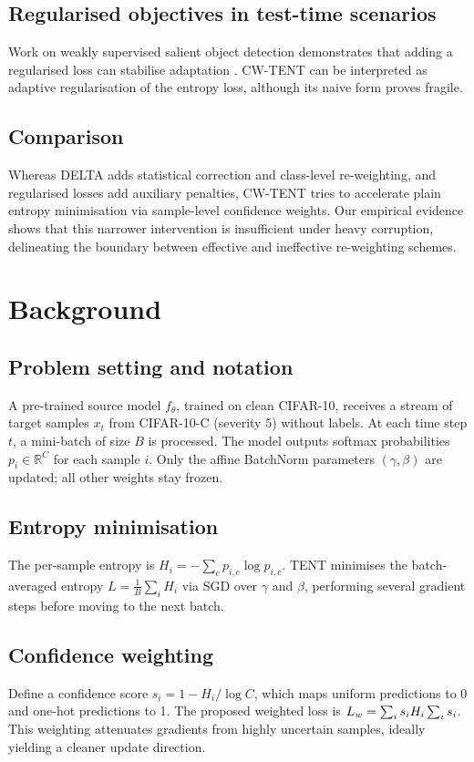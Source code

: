 \documentclass{article} %
\begin{document}
\subsection{Regularised objectives in test-time scenarios}
Work on weakly supervised salient object detection demonstrates that adding a regularised loss can stabilise adaptation \cite{author-year-test}. CW-TENT can be interpreted as adaptive regularisation of the entropy loss, although its naive form proves fragile.

\subsection{Comparison}
Whereas DELTA adds statistical correction and class-level re-weighting, and regularised losses add auxiliary penalties, CW-TENT tries to accelerate plain entropy minimisation via sample-level confidence weights. Our empirical evidence shows that this narrower intervention is insufficient under heavy corruption, delineating the boundary between effective and ineffective re-weighting schemes.

\section{Background}
\label{sec:background}
\subsection{Problem setting and notation}
A pre-trained source model \(f_{\theta}\), trained on clean CIFAR-10, receives a stream of target samples \(x_t\) from CIFAR-10-C (severity 5) without labels. At each time step \(t\), a mini-batch of size \(B\) is processed. The model outputs softmax probabilities \(p_i \in \mathbb{R}^C\) for each sample \(i\). Only the affine BatchNorm parameters \((\gamma, \beta)\) are updated; all other weights stay frozen.

\subsection{Entropy minimisation}
The per-sample entropy is \(H_i = -\sum_{c} p_{i,c} \log p_{i,c}\). TENT minimises the batch-averaged entropy \(L = \tfrac{1}{B} \sum_i H_i\) via SGD over \(\gamma\) and \(\beta\), performing several gradient steps before moving to the next batch.

\subsection{Confidence weighting}
Define a confidence score \(s_i = 1 - H_i/\log C\), which maps uniform predictions to 0 and one-hot predictions to 1. The proposed weighted loss is \(L_w = \sum_i s_i H_i \/ \sum_i s_i\). This weighting attenuates gradients from highly uncertain samples, ideally yielding a cleaner update direction.
\end{document}

